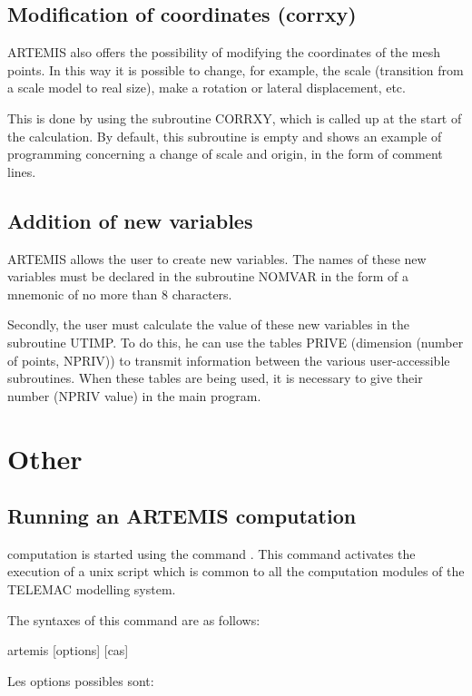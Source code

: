 \section{Modification of coordinates (corrxy)}

ARTEMIS also offers the possibility of modifying the coordinates of the mesh
points. In this way it is possible to change, for example, the scale
(transition from a scale model to real size), make a rotation or lateral
displacement, etc.

This is done by using the subroutine CORRXY, which is called up at the start of
the calculation. By default, this subroutine is empty and shows an example of
programming concerning a change of scale and origin, in the form of comment
lines.


\section{Addition of new variables}

ARTEMIS allows the user to create new variables. The names of these new
variables must be declared in the subroutine NOMVAR in the form of a mnemonic
of no more than 8 characters.

Secondly, the user must calculate the value of these new variables in the
subroutine UTIMP\@. To do this, he can use the tables PRIVE (dimension (number of
points, NPRIV)) to transmit information between the various user-accessible
subroutines. When these tables are being used, it is necessary to give their
number (NPRIV value) in the main program.


\chapter{Other}

\section{Running an ARTEMIS computation}

computation is started using the command \artemis{}. This command activates the
execution of a unix script which is common to all the computation modules of
the TELEMAC modelling system.

The syntaxes of this command are as follows:

artemis [options] [cas]

Les options possibles sont:


